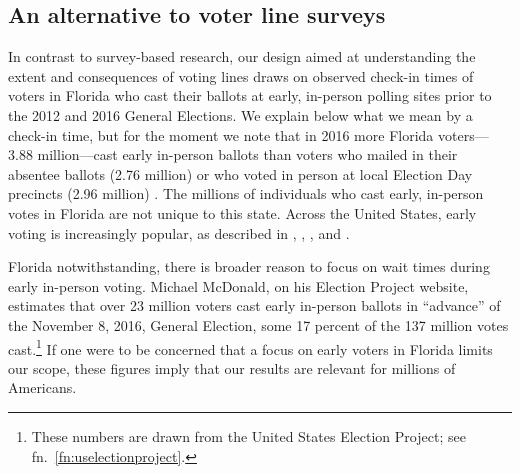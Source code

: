 \documentclass[12pt,titlepage]{article}
\begin{document}

\subsection*{An alternative to voter line surveys}

In contrast to survey-based research, our design aimed at
understanding the extent and consequences of voting lines draws on
\mbox{observed} check-in times of voters in Florida who cast their
ballots at early, in-person polling sites prior to the 2012 and 2016
General Elections. We explain below what we mean by a check-in time,
but for the moment we note that in 2016 more Florida voters---3.88
million---cast early in-person ballots than voters who mailed in their
absentee ballots (2.76 million) or who voted in person at local
Election Day precincts (2.96 million) \citep{FDOS:2016vote}. The
millions of individuals who cast early, in-person votes in Florida are
not unique to this state. Across the United States, early voting is
increasingly popular, as described in
\citet{neelyrichardson:earlyvoting}, \citet{gronkebaum:growth},
\citet{gronketoffey:psychological}, and
\citet{burdenetal:unanticipated}.




Florida notwithstanding, there is broader reason to focus on wait times
during early in-person voting. Michael McDonald, on his Election
Project website, estimates that over 23 million voters cast early
in-person ballots in ``advance'' of the November 8, 2016, General
Election, some 17 percent of the 137 million votes
cast.\footnote{These numbers are drawn from the United States Election
  Project; see fn.\ \ref{fn:uselectionproject}.} If one were to be
concerned that a focus on early voters in Florida limits our scope,
these figures imply that our results are relevant for millions of
Americans.

\end{document}
